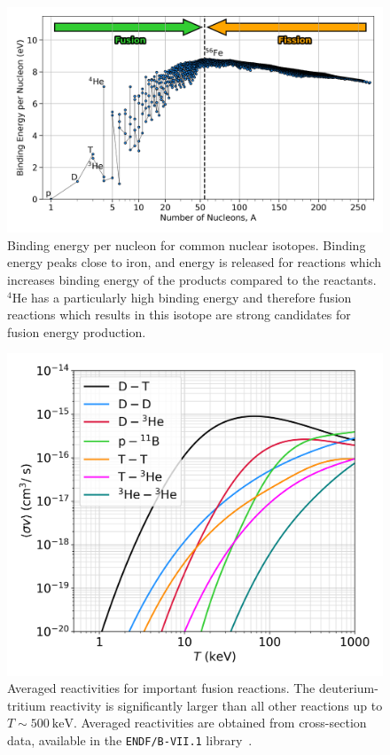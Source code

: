 \begin{figure}[t!]
    \includegraphics[width=0.9\linewidth]{Introduction/Images/BE_per_nucleon.png}
    \centering
    \caption{Binding energy per nucleon for common nuclear isotopes.
    Binding energy peaks close to iron, and energy is released for reactions which increases binding energy of the products compared to the reactants.
    ${}^{4}\text{He}$ has a particularly high binding energy and therefore fusion reactions which results in this isotope are strong candidates for fusion energy production.}%
    \label{fig:intro_BEperNucleon}
\end{figure}

\begin{figure}[t!]
    \includegraphics[width=0.6\linewidth]{Introduction/Images/fusion-reactivities.png}
    \centering
    \caption{Averaged reactivities for important fusion reactions.
    The deuterium-tritium reactivity is significantly larger than all other reactions up to $T\sim500\ \text{keV}$.
    Averaged reactivities are obtained from cross-section data, available in the \texttt{ENDF/B-VII.1} library~\cite{chadwick_endf_2011}.
    }%
    \label{fig:intro_reactivities}
\end{figure}

